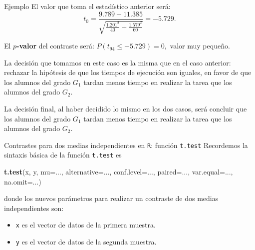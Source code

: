 \documentclass[
  ignorenonframetext,
]{beamer}
\newenvironment{Shaded}{\begin{snugshade}}{\end{snugshade}}
\newcommand{\DataTypeTok}[1]{\textcolor[rgb]{0.13,0.29,0.53}{#1}}
\newcommand{\KeywordTok}[1]{\textcolor[rgb]{0.13,0.29,0.53}{\textbf{#1}}}
\newcommand{\NormalTok}[1]{#1}
\begin{document}
\begin{frame}{Ejemplo}
\protect\hypertarget{ejemplo-29}{}
El valor que toma el estadístico anterior será: \[
t_0=\frac{9.789-11.385}{\sqrt{\frac{1.201^2}{40}+\frac{1.579^2}{60}}}=-5.729.
\]

El \textbf{\(p\)-valor} del contraste será: \(P(t_{94}\leq -5.729)= 0,\)
valor muy pequeño.

La decisión que tomamos en este caso es la misma que en el caso
anterior: rechazar la hipótesis de que los tiempos de ejecución son
iguales, en favor de que los alumnos del grado \(G_1\) tardan menos
tiempo en realizar la tarea que los alumnos del grado \(G_2\).

La decisión final, al haber decidido lo mismo en los dos casos, será
concluir que los alumnos del grado \(G_1\) tardan menos tiempo en
realizar la tarea que los alumnos del grado \(G_2\).
\end{frame}

\begin{frame}[fragile]{Contrastes para dos medias independientes en
\texttt{R}: función \texttt{t.test}}
\protect\hypertarget{contrastes-para-dos-medias-independientes-en-r-funciuxf3n-t.test}{}
Recordemos la sintaxis básica de la función \texttt{t.test} es

\begin{Shaded}
\begin{Highlighting}[]
\KeywordTok{t.test}\NormalTok{(x, y, }\DataTypeTok{mu=}\NormalTok{..., }\DataTypeTok{alternative=}\NormalTok{..., }\DataTypeTok{conf.level=}\NormalTok{..., }\DataTypeTok{paired=}\NormalTok{..., }
       \DataTypeTok{var.equal=}\NormalTok{..., }\DataTypeTok{na.omit=}\NormalTok{...)}
\end{Highlighting}
\end{Shaded}

donde los nuevos parámetros para realizar un contraste de dos medias
independientes son:

\begin{itemize}[<+->]
\item
  \texttt{x} es el vector de datos de la primera muestra.
\item
  \texttt{y} es el vector de datos de la segunda muestra.
\end{itemize}
\end{frame}
\end{document}
